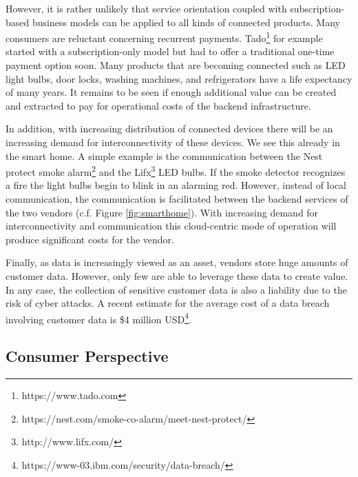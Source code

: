 However, it is rather unlikely that service orientation coupled with subscription-based business models can be applied to all kinds of connected products. Many consumers are reluctant concerning recurrent payments. Tado\footnote{https://www.tado.com} for example started with a subscription-only model but had to offer a traditional one-time payment option soon. Many products that are becoming connected such as LED light bulbs, door locks, washing machines, and refrigerators have a life expectancy of many years. It remains to be seen if enough additional value can be created and extracted to pay for operational costs of the backend infrastructure.

In addition, with increasing distribution of connected devices there will be an increasing demand for interconnectivity of these devices. We see this already in the smart home. A simple example is the communication between the Nest protect smoke alarm\footnote{https://nest.com/smoke-co-alarm/meet-nest-protect/} and the Lifx\footnote{http://www.lifx.com/} LED bulbs. If the smoke detector recognizes a fire the light bulbs begin to blink in an alarming red. However, instead of local communication, the communication is facilitated between the backend services of the two vendors (c.f. Figure \ref{fig:smarthome}). With increasing demand for interconnectivity and communication this cloud-centric mode of operation will produce significant costs for the vendor.

Finally, as data is increasingly viewed as an asset, vendors store huge amounts of customer data. However, only few are able to leverage these data to create value. In any case, the collection of sensitive customer data is also a liability due to the risk of cyber attacks. A recent estimate for the average cost of a data breach involving customer data is \$4 million USD\footnote{https://www-03.ibm.com/security/data-breach/}.


\subsection{Consumer Perspective}

